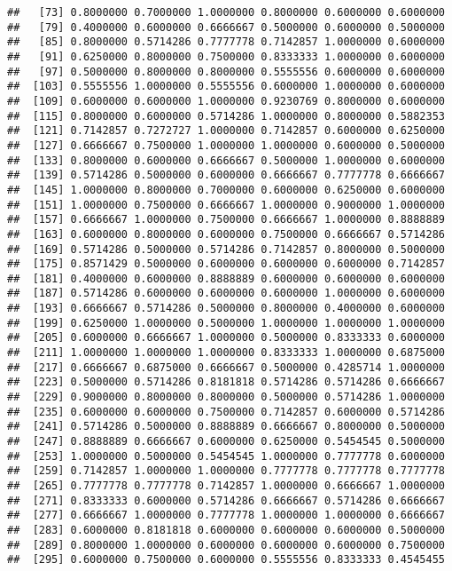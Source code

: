 \documentclass[]{article}
\begin{document}
\begin{verbatim}
##   [73] 0.8000000 0.7000000 1.0000000 0.8000000 0.6000000 0.6000000
##   [79] 0.4000000 0.6000000 0.6666667 0.5000000 0.6000000 0.5000000
##   [85] 0.8000000 0.5714286 0.7777778 0.7142857 1.0000000 0.6000000
##   [91] 0.6250000 0.8000000 0.7500000 0.8333333 1.0000000 0.6000000
##   [97] 0.5000000 0.8000000 0.8000000 0.5555556 0.6000000 0.6000000
##  [103] 0.5555556 1.0000000 0.5555556 0.6000000 1.0000000 0.6000000
##  [109] 0.6000000 0.6000000 1.0000000 0.9230769 0.8000000 0.6000000
##  [115] 0.8000000 0.6000000 0.5714286 1.0000000 0.8000000 0.5882353
##  [121] 0.7142857 0.7272727 1.0000000 0.7142857 0.6000000 0.6250000
##  [127] 0.6666667 0.7500000 1.0000000 1.0000000 0.6000000 0.5000000
##  [133] 0.8000000 0.6000000 0.6666667 0.5000000 1.0000000 0.6000000
##  [139] 0.5714286 0.5000000 0.6000000 0.6666667 0.7777778 0.6666667
##  [145] 1.0000000 0.8000000 0.7000000 0.6000000 0.6250000 0.6000000
##  [151] 1.0000000 0.7500000 0.6666667 1.0000000 0.9000000 1.0000000
##  [157] 0.6666667 1.0000000 0.7500000 0.6666667 1.0000000 0.8888889
##  [163] 0.6000000 0.8000000 0.6000000 0.7500000 0.6666667 0.5714286
##  [169] 0.5714286 0.5000000 0.5714286 0.7142857 0.8000000 0.5000000
##  [175] 0.8571429 0.5000000 0.6000000 0.6000000 0.6000000 0.7142857
##  [181] 0.4000000 0.6000000 0.8888889 0.6000000 0.6000000 0.6000000
##  [187] 0.5714286 0.6000000 0.6000000 0.6000000 1.0000000 0.6000000
##  [193] 0.6666667 0.5714286 0.5000000 0.8000000 0.4000000 0.6000000
##  [199] 0.6250000 1.0000000 0.5000000 1.0000000 1.0000000 1.0000000
##  [205] 0.6000000 0.6666667 1.0000000 0.5000000 0.8333333 0.6000000
##  [211] 1.0000000 1.0000000 1.0000000 0.8333333 1.0000000 0.6875000
##  [217] 0.6666667 0.6875000 0.6666667 0.5000000 0.4285714 1.0000000
##  [223] 0.5000000 0.5714286 0.8181818 0.5714286 0.5714286 0.6666667
##  [229] 0.9000000 0.8000000 0.8000000 0.5000000 0.5714286 1.0000000
##  [235] 0.6000000 0.6000000 0.7500000 0.7142857 0.6000000 0.5714286
##  [241] 0.5714286 0.5000000 0.8888889 0.6666667 0.8000000 0.5000000
##  [247] 0.8888889 0.6666667 0.6000000 0.6250000 0.5454545 0.5000000
##  [253] 1.0000000 0.5000000 0.5454545 1.0000000 0.7777778 0.6000000
##  [259] 0.7142857 1.0000000 1.0000000 0.7777778 0.7777778 0.7777778
##  [265] 0.7777778 0.7777778 0.7142857 1.0000000 0.6666667 1.0000000
##  [271] 0.8333333 0.6000000 0.5714286 0.6666667 0.5714286 0.6666667
##  [277] 0.6666667 1.0000000 0.7777778 1.0000000 1.0000000 0.6666667
##  [283] 0.6000000 0.8181818 0.6000000 0.6000000 0.6000000 0.5000000
##  [289] 0.8000000 1.0000000 0.6000000 0.6000000 0.6000000 0.7500000
##  [295] 0.6000000 0.7500000 0.6000000 0.5555556 0.8333333 0.4545455

\end{verbatim}
\end{document}
